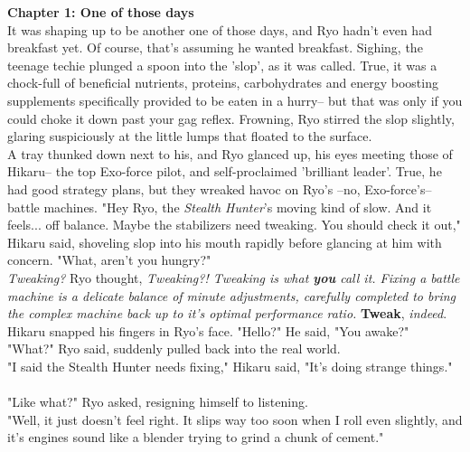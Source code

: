 \documentclass[11pt,twoside,a4paper]{book}
\begin{document}
\begin{multicols*}{2}
	\small

\textbf{\large Chapter 1: One of those days} ~\\

It was shaping up to be another one of those days, and Ryo hadn't even had breakfast yet. Of course, that's assuming he wanted breakfast. Sighing, the teenage techie plunged a spoon into the 'slop', as it was called. True, it was a chock-full of beneficial nutrients, proteins, carbohydrates and energy boosting supplements specifically provided to be eaten in a hurry-- but that was only if you could choke it down past your gag reflex. Frowning, Ryo stirred the slop slightly, glaring suspiciously at the little lumps that floated to the surface. ~\\

A tray thunked down next to his, and Ryo glanced up, his eyes meeting those of Hikaru-- the top Exo-force pilot, and self-proclaimed 'brilliant leader'. True, he had good strategy plans, but they wreaked havoc on Ryo's --no, Exo-force's-- battle machines. "Hey Ryo, the \emph{Stealth Hunter}'s moving kind of slow. And it feels... off balance. Maybe the stabilizers need tweaking. You should check it out," Hikaru said, shoveling slop into his mouth rapidly before glancing at him with concern. "What, aren't you hungry?" ~\\

\emph{Tweaking?} Ryo thought, \emph{Tweaking?! Tweaking is what \textbf{you} call it. Fixing a battle machine is a delicate balance of minute adjustments, carefully completed to bring the complex machine back up to it's optimal performance ratio.} \textbf{Tweak}, \emph{indeed}. ~\\

Hikaru snapped his fingers in Ryo's face. "Hello?" He said, "You awake?" ~\\

"What?" Ryo said, suddenly pulled back into the real world. ~\\

"I said the Stealth Hunter needs fixing," Hikaru said, "It's doing strange things." ~\\

"Like what?" Ryo asked, resigning himself to listening. ~\\

"Well, it just doesn't feel right. It slips way too soon when I roll even slightly, and it's engines sound like a blender trying to grind a chunk of cement." ~\\


\end{multicols*}
\end{document}
